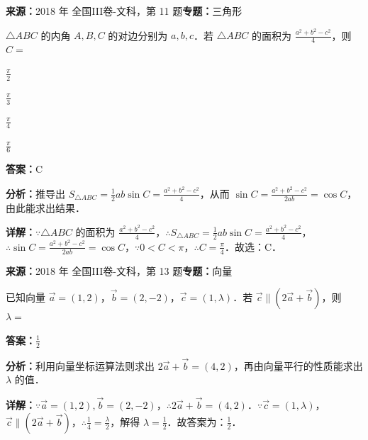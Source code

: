 \begin{question}[points=5]
\textbf{来源：}2018 年 全国III卷-文科，第 11 题\quad \textbf{专题：}三角形\par
$\triangle ABC$ 的内角 $A,B,C$ 的对边分别为 $a,b,c$．若 $\triangle ABC$ 的面积为 $\frac{a^2+b^2-c^2}{4}$，则 $C=$
\begin{choices}
  \item $\frac{\pi}{2}$
  \item $\frac{\pi}{3}$
  \item $\frac{\pi}{4}$
  \item $\frac{\pi}{6}$
\end{choices}
\begin{solution}
\textbf{答案：}C

\textbf{分析：}推导出 $S_{\triangle ABC}= \frac{1}{2}ab\sin C = \frac{a^2+b^2-c^2}{4}$，从而 $\sin C = \frac{a^2+b^2-c^2}{2ab} = \cos C$，由此能求出结果．

\textbf{详解：}$\because \triangle ABC$ 的面积为 $\frac{a^2+b^2-c^2}{4}$，$\therefore S_{\triangle ABC}= \frac{1}{2}ab\sin C = \frac{a^2+b^2-c^2}{4}$，$\therefore \sin C = \frac{a^2+b^2-c^2}{2ab} = \cos C$，$\because 0<C<\pi$，$\therefore C=\frac{\pi}{4}$．故选：C．
\end{solution}
\end{question}

\begin{question}[points=5]
\textbf{来源：}2018 年 全国III卷-文科，第 13 题\quad \textbf{专题：}向量\par
已知向量 $\overrightarrow{a}=(1,2)$，$\overrightarrow{b}=(2,-2)$，$\overrightarrow{c}=(1,\lambda)$．若 $\overrightarrow{c}\parallel(2\overrightarrow{a}+\overrightarrow{b})$，则 $\lambda=$
\fillin[{$\frac{1}{2}$}]
\begin{solution}
\textbf{答案：}$\frac{1}{2}$

\textbf{分析：}利用向量坐标运算法则求出 $2\overrightarrow{a}+\overrightarrow{b}=(4,2)$，再由向量平行的性质能求出 $\lambda$ 的值．

\textbf{详解：}$\because \overrightarrow{a}=(1,2),\overrightarrow{b}=(2,-2)$，$\therefore 2\overrightarrow{a}+\overrightarrow{b}=(4,2)$．$\because \overrightarrow{c}=(1,\lambda)$，$\overrightarrow{c}\parallel(2\overrightarrow{a}+\overrightarrow{b})$，$\therefore \frac{1}{4} = \frac{\lambda}{2}$，解得 $\lambda=\frac{1}{2}$．故答案为：$\frac{1}{2}$．
\end{solution}
\end{question}

